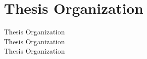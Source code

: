 
\section{Thesis Organization}

Thesis Organization \\
Thesis Organization \\
Thesis Organization \\
